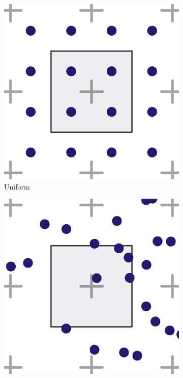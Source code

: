 \begin{figure}
\begin{fullwidth}
	\begin{subfigure}[b]{0.24\thewidth}
		\includegraphics[width=1.\textwidth]{figures/intro/Supersampling-Uniform}
		\caption{Uniform}
	\end{subfigure}
	\begin{subfigure}[b]{0.24\thewidth}
		\includegraphics[width=1.\textwidth]{figures/intro/Supersampling-Random}

\end{subfigure}
\end{fullwidth}
\end{figure}
